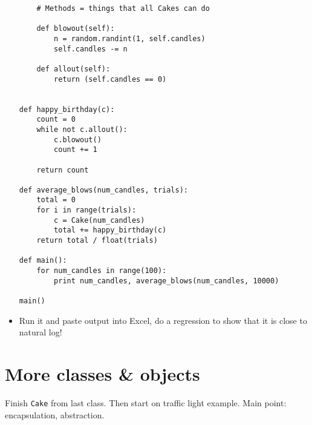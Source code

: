 \documentclass{article}
\begin{document}
\begin{itemize}
\begin{verbatim}
    # Methods = things that all Cakes can do

    def blowout(self):
        n = random.randint(1, self.candles)
        self.candles -= n

    def allout(self):
        return (self.candles == 0)


def happy_birthday(c):
    count = 0
    while not c.allout():
        c.blowout()
        count += 1

    return count

def average_blows(num_candles, trials):
    total = 0
    for i in range(trials):
        c = Cake(num_candles)
        total += happy_birthday(c)
    return total / float(trials)

def main():
    for num_candles in range(100):
        print num_candles, average_blows(num_candles, 10000)

main()
\end{verbatim}
\item Run it and paste output into Excel, do a regression to show that
  it is close to natural log!
\end{itemize}

\newpage
\section{More classes \& objects}

Finish \verb|Cake| from last class. Then start on traffic light
example.  Main point: encapsulation, abstraction.
\end{document}
